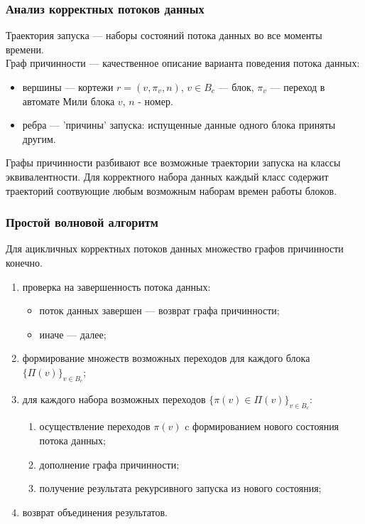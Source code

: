 \documentclass[10pt,pdf,hyperref={unicode}]{beamer}
\begin{document}
\begin{frame}
  \frametitle{Анализ корректных потоков данных}
  Траектория запуска --- наборы состояний потока данных во все моменты времени. \\
  Граф причинности --- качественное описание варианта поведения потока данных:
  \begin{itemize}
    \item вершины --- кортежи $r = (v, \pi_v, n)$, $v \in B_c$ --- блок, $\pi_v$ --- переход в автомате Мили блока $v$, $n$ - номер.
    \item ребра --- 'причины' запуска: испущенные данные одного блока приняты другим.
  \end{itemize}
  Графы причинности разбивают все возможные траектории запуска на классы эквивалентности.
  Для корректного набора данных каждый класс содержит траекторий соотвующие любым возможным наборам времен работы блоков.
\end{frame}

\begin{frame}
  \frametitle{Простой волновой алгоритм}
  Для ацикличных корректных потоков данных множество графов причинности конечно.
  \begin{enumerate}
    \item проверка на завершенность потока данных:
      \begin{itemize}
        \item поток данных завершен --- возврат графа причинности;
        \item иначе --- далее;
      \end{itemize}
    \item формирование множеств возможных переходов для каждого блока $\{\Pi(v)\}_{v \in B_c}$;
    \item для каждого набора возможных переходов $\{\pi(v) \in \Pi(v)\}_{v \in B_c}$:
    \begin{enumerate}
      \item осуществление переходов $\pi(v)$ c формированием нового состояния потока данных;
      \item дополнение графа причинности;
      \item получение результата рекурсивного запуска из нового состояния;
    \end{enumerate}
    \item возврат объединения результатов.
  \end{enumerate}
\end{frame}
\end{document}
